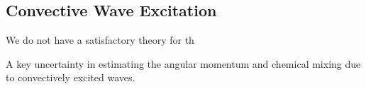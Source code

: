 {\color{purple}
\subsection{Convective Wave Excitation}
}

We do not have a satisfactory theory for th

A key uncertainty in estimating the angular momentum and chemical mixing due to convectively excited waves.
